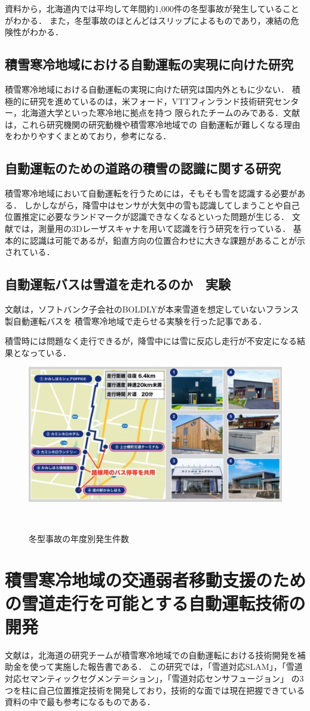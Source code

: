 \documentclass[a4paper]{jarticle}
\begin{document}
資料から，北海道内では平均して年間約1,000件の冬型事故が発生していることがわかる．
また，冬型事故のほとんどはスリップによるものであり，凍結の危険性がわかる．

\subsection{積雪寒冷地域における自動運転の実現に向けた研究}
積雪寒冷地域における自動運転の実現に向けた研究は国内外ともに少ない．
積極的に研究を進めているのは，米フォード，VTTフィンランド技術研究センター，北海道大学といった寒冷地に拠点を持つ
限られたチームのみである．文献\cite{cobby:online}は，これら研究機関の研究動機や積雪寒冷地域での
自動運転が難しくなる理由をわかりやすくまとめており，参考になる．

\subsection{自動運転のための道路の積雪の認識に関する研究}
積雪寒冷地域において自動運転を行うためには，そもそも雪を認識する必要がある．
しかしながら，降雪中はセンサが大気中の雪も認識してしまうことや自己位置推定に必要なランドマークが認識できなくなるといった問題が生じる．
文献\cite{ja83:online}では，測量用の3Dレーザスキャナを用いて認識を行う研究を行っている．
基本的に認識は可能であるが，鉛直方向の位置合わせに大きな課題があることが示されている．

\subsection{自動運転バスは雪道を走れるのか　実験}
文献\cite{bass:online}は，ソフトバンク子会社のBOLDLYが本来雪道を想定していないフランス製自動運転バスを
積雪寒冷地域で走らせる実験を行った記事である．

積雪時には問題なく走行できるが，降雪中には雪に反応し走行が不安定になる結果となっている．

\begin{figure}[H]
  \centering
  \includegraphics[width=0.4\linewidth]{picture/02.jpg}
  \caption{冬型事故の年度別発生件数}　
  \label{02}
\end{figure}

\section{積雪寒冷地域の交通弱者移動支援のための雪道走行を可能とする自動運転技術の開発}
文献\cite{2910102026:online}は，北海道の研究チームが積雪寒冷地域での自動運転における技術開発を補助金を使って実施した報告書である．
この研究では，「雪道対応SLAM」，「雪道対応セマンティックセグメンテ＝ション」，「雪道対応センサフュージョン」
の3つを柱に自己位置推定技術を開発しており，技術的な面では現在把握できている資料の中で最も参考になるものである．
\end{document}
